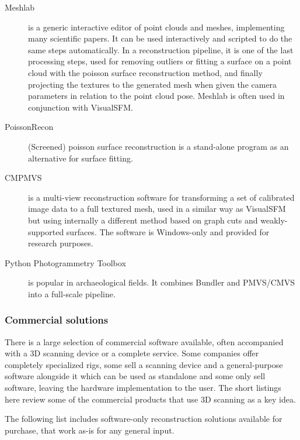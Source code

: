 \begin{description}
	\item[Meshlab] \cite{meshlab} is a generic interactive editor of point clouds and meshes, implementing many scientific papers.
		It can be used interactively and scripted to do the same steps automatically.
		In a reconstruction pipeline, it is one of the last processing steps, used for removing outliers or fitting a surface on a point cloud with the poisson surface reconstruction method, and finally projecting the textures to the generated mesh when given the camera parameters in relation to the point cloud pose.
		Meshlab is often used in conjunction with VisualSFM.

	\item[PoissonRecon] \cite{kazhdan2013screened} (Screened) poisson surface reconstruction is a stand-alone program as an alternative for surface fitting.

	\item[CMPMVS] \cite{jancosek2011multi} is a multi-view reconstruction software for transforming a set of calibrated image data to a full textured mesh, used in a similar way as VisualSFM but using internally a different method based on graph cuts and weakly-supported surfaces.
		The software is Windows-only and provided for research purposes.

	\item[Python Photogrammetry Toolbox] \cite{moulon2011python} is popular in archaeological fields.
		It combines Bundler and PMVS/CMVS into a full-scale pipeline.
\end{description}


\subsubsection{Commercial solutions} %

There is a large selection of commercial software available, often accompanied with a 3D scanning device or a complete service.
Some companies offer completely specialized rigs, some sell a scanning device and a general-purpose software alongside it which can be used as standalone and some only sell software, leaving the hardware implementation to the user.
The short listings here review some of the commercial products that use 3D scanning as a key idea.

The following list includes software-only reconstruction solutions available for purchase, that work as-is for any general input.

